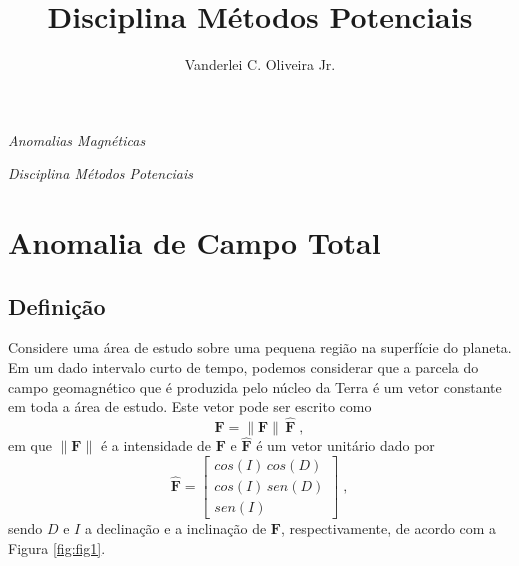 \documentclass[10pt,a4paper,fleqn]{article}
\title{Disciplina M\'{e}todos Potenciais}
\author{Vanderlei C. Oliveira Jr.}
\date{}
\begin{document}
\begin{center}

\begin{huge}
\emph{Anomalias Magn\'{e}ticas}
\end{huge}

\bigskip
\bigskip

\begin{large}
\emph{Disciplina M\'{e}todos Potenciais}
\end{large}

\end{center}

\bigskip
\bigskip

\begin{center}


\end{center}

\clearpage

\tableofcontents

\clearpage

\section{Anomalia de Campo Total}

\subsection{Definiç\~{a}o}

Considere uma \'{a}rea de estudo sobre uma pequena região na superfície do planeta. 
Em um dado intervalo curto de tempo, podemos considerar que a parcela do campo 
geomagnético que é produzida pelo n\'{u}cleo da Terra é 
um vetor constante em toda a \'{a}rea de estudo. Este vetor pode ser escrito como
\begin{equation}
\mathbf{F} = \| \mathbf{F} \| \, \hat{\mathbf{F}} \; ,
\label{eq:campo-geomagnetico}
\end{equation}
em que $\| \mathbf{F} \|$ é a intensidade de $\mathbf{F}$ e $\hat{\mathbf{F}}$ é um vetor unitário
dado por
\begin{equation}
\hat{\mathbf{F}} = \left[
\begin{array}{c}
cos(I) \, cos(D) \\
cos(I) \, sen(D) \\
sen(I)
\end{array}
\right] \; ,
\label{eq:versor-campo-geomagnetico}
\end{equation}
sendo $D$ e $I$ a declinação e a inclinação de $\mathbf{F}$, respectivamente, de 
acordo com a Figura \ref{fig:fig1}.
\end{document}
